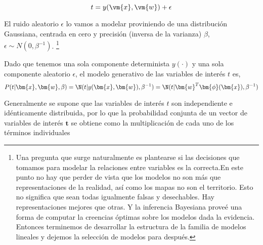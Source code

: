 \documentclass[a4paper,10pt]{article}
\begin{document}
\begin{equation}
 t = y(\vm{x},\vm{w}) + \epsilon
\end{equation}
 
El ruido aleatorio $\epsilon$ lo vamos a modelar proviniendo de una distribuci\'on Gaussiana, centrada en cero y precisi\'on (inversa de la varianza) $\beta$, $\epsilon \sim N(0,\beta^{-1})$.
\footnote{Una pregunta que surge naturalmente es plantearse si las decisiones que tomamos para modelar la relaciones entre variables es la correcta.En este punto no hay que perder de vista que los modelos no son m\'as que representaciones de la realidad, as\'i como los mapas no son el territorio.
Esto no significa que sean todas igualmente falsas y desechables.
Hay representaciones mejores que otras.
Y la inferencia Bayesiana prove\'e una forma de computar la creencias \'optimas sobre los modelos dada la evidencia.
Entonces terminemos de desarrollar la estructura de la familia de modelos lineales y dejemos la selecci\'on de modelos para despu\'es.}

Dado que tenemos una sola componente determinista $y(\cdot)$ y una sola componente aleatorio $\epsilon$, el modelo generativo de las variables de inter\'es $t$ es,
\begin{equation}
P(t | \bm{x}, \bm{w}, \beta) = \N(t | y(\bm{x},\bm{w}), \beta^{-1}) = \N(t | \bm{w}^T \bm{\phi}(\bm{x}) , \beta^{-1})
\end{equation}

% 
% 
%     
%     
%       
% 

Generalmente se supone que las variables de inter\'es $t$ son independiente e id\'enticamente distribuida, por lo que la probabilidad conjunta de un vector de variables de inter\'es $\bm{t}$ se obtiene como la multiplicaci\'on de cada uno de los t\'erminos individuales
\end{document}
